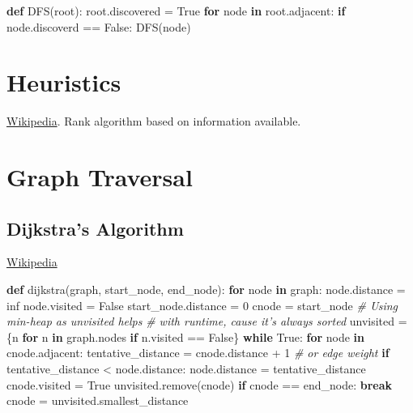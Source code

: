 \documentclass[12pt]{article}
\newenvironment{Shaded}{}{}
\newcommand{\KeywordTok}[1]{\textcolor[rgb]{0.00,0.44,0.13}{\textbf{{#1}}}}
\newcommand{\DecValTok}[1]{\textcolor[rgb]{0.25,0.63,0.44}{{#1}}}
\newcommand{\CommentTok}[1]{\textcolor[rgb]{0.38,0.63,0.69}{\textit{{#1}}}}
\newcommand{\NormalTok}[1]{{#1}}
\newcommand{\VariableTok}[1]{\textcolor[rgb]{0.10,0.09,0.49}{{#1}}}
\newcommand{\ControlFlowTok}[1]{\textcolor[rgb]{0.00,0.44,0.13}{\textbf{{#1}}}}
\newcommand{\OperatorTok}[1]{\textcolor[rgb]{0.40,0.40,0.40}{{#1}}}
\begin{document}
\begin{Shaded}
\begin{Highlighting}[]
\KeywordTok{def} \NormalTok{DFS(root):}
  \NormalTok{root.discovered }\OperatorTok{=} \VariableTok{True}
  \ControlFlowTok{for} \NormalTok{node }\KeywordTok{in} \NormalTok{root.adjacent:}
    \ControlFlowTok{if} \NormalTok{node.discoverd }\OperatorTok{==} \VariableTok{False}\NormalTok{:}
      \NormalTok{DFS(node)}
\end{Highlighting}
\end{Shaded}

    \section{Heuristics}\label{heuristics}

\href{https://en.wikipedia.org/wiki/Heuristic_(computer_science)}{Wikipedia}.
Rank algorithm based on information available.

    \section{Graph Traversal}\label{graph-traversal}

    \subsection{Dijkstra's Algorithm}\label{dijkstras-algorithm}

\href{https://en.wikipedia.org/wiki/Dijkstra\%27s_algorithm}{Wikipedia}

\begin{Shaded}
\begin{Highlighting}[]
\KeywordTok{def} \NormalTok{dijkstra(graph, start_node, end_node):}
  \ControlFlowTok{for} \NormalTok{node }\KeywordTok{in} \NormalTok{graph:}
    \NormalTok{node.distance }\OperatorTok{=} \NormalTok{inf}
    \NormalTok{node.visited }\OperatorTok{=} \VariableTok{False}
  \NormalTok{start_node.distance }\OperatorTok{=} \DecValTok{0}
  \NormalTok{cnode }\OperatorTok{=} \NormalTok{start_node}
  \CommentTok{# Using min-heap as unvisited helps}
  \CommentTok{# with runtime, cause it's always sorted}
  \NormalTok{unvisited }\OperatorTok{=} \NormalTok{\{n }\ControlFlowTok{for} \NormalTok{n }\KeywordTok{in} \NormalTok{graph.nodes }\ControlFlowTok{if} \NormalTok{n.visited }\OperatorTok{==} \VariableTok{False}\NormalTok{\}}
  \ControlFlowTok{while} \VariableTok{True}\NormalTok{:}
    \ControlFlowTok{for} \NormalTok{node }\KeywordTok{in} \NormalTok{cnode.adjacent:}
      \NormalTok{tentative_distance }\OperatorTok{=} \NormalTok{cnode.distance }\OperatorTok{+} \DecValTok{1} \CommentTok{# or edge weight}
      \ControlFlowTok{if} \NormalTok{tentative_distance }\OperatorTok{<} \NormalTok{node.distance:}
        \NormalTok{node.distance }\OperatorTok{=} \NormalTok{tentative_distance}
      \NormalTok{cnode.visited }\OperatorTok{=} \VariableTok{True}
      \NormalTok{unvisited.remove(cnode)}
      \ControlFlowTok{if} \NormalTok{cnode }\OperatorTok{==} \NormalTok{end_node:}
        \ControlFlowTok{break}
      \NormalTok{cnode }\OperatorTok{=} \NormalTok{unvisited.smallest_distance}
\end{Highlighting}
\end{Shaded}
\end{document}
